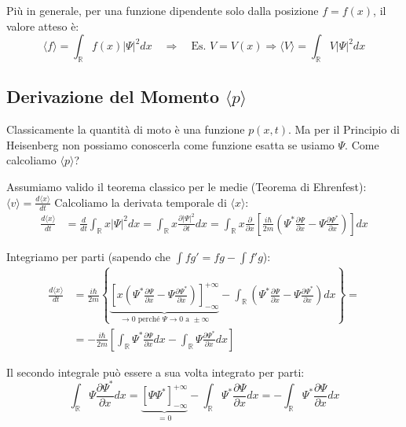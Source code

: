 \documentclass[11pt, a4paper]{article}
\begin{document}
\noindent
Più in generale, per una funzione dipendente solo dalla posizione $f = f(x)$, il valore atteso è: %
\begin{equation*}
    \langle f \rangle = \int_{\mathbb{R}} f(x) |\Psi|^2 dx \quad \Rightarrow \quad \text{Es. } V = V(x) \Rightarrow \langle V \rangle = \int_{\mathbb{R}} V |\Psi|^2 dx %
\end{equation*}

\subsection{Derivazione del Momento $\langle p \rangle$} %

Classicamente la quantità di moto è una funzione $p(x,t)$. Ma per il Principio di Heisenberg non possiamo conoscerla come funzione esatta se usiamo $\Psi$. Come calcoliamo $\langle p \rangle$? %

\noindent
Assumiamo valido il teorema classico per le medie (Teorema di Ehrenfest): $\langle v \rangle = \frac{d\langle x \rangle}{dt}$ %
Calcoliamo la derivata temporale di $\langle x \rangle$: %
\begin{align*}
    \frac{d\langle x \rangle}{dt} &= \frac{d}{dt} \int_{\mathbb{R}} x |\Psi|^2 dx = \int_{\mathbb{R}} x \frac{\partial |\Psi|^2}{\partial t} dx = \int_{\mathbb{R}} x \frac{\partial}{\partial x} \left[ \frac{i\hbar}{2m} \left( \Psi^* \frac{\partial \Psi}{\partial x} - \Psi \frac{\partial \Psi^*}{\partial x} \right) \right] dx %
\end{align*}

Integriamo per parti (sapendo che $\int f g' = fg - \int f' g$): %
\begin{align*}
    \frac{d\langle x \rangle}{dt} &= \frac{i\hbar}{2m} \left\{ \underbrace{ \left[ x \left( \Psi^* \frac{\partial \Psi}{\partial x} - \Psi \frac{\partial \Psi^*}{\partial x} \right) \right]_{-\infty}^{+\infty} }_{\to 0 \text{ perché } \Psi \to 0 \text{ a } \pm\infty} - \int_{\mathbb{R}} \left( \Psi^* \frac{\partial \Psi}{\partial x} - \Psi \frac{\partial \Psi^*}{\partial x} \right) dx \right\} = \\ %
    &= -\frac{i\hbar}{2m} \left[ \int_{\mathbb{R}} \Psi^* \frac{\partial \Psi}{\partial x} dx - \int_{\mathbb{R}} \Psi \frac{\partial \Psi^*}{\partial x} dx \right] %
\end{align*}

Il secondo integrale può essere a sua volta integrato per parti: %
\begin{equation*}
    \int_{\mathbb{R}} \Psi \frac{\partial \Psi^*}{\partial x} dx = \underbrace{ [\Psi \Psi^*]_{-\infty}^{+\infty} }_{=0} - \int_{\mathbb{R}} \Psi^* \frac{\partial \Psi}{\partial x} dx = -\int_{\mathbb{R}} \Psi^* \frac{\partial \Psi}{\partial x} dx %
\end{equation*}
\end{document}
